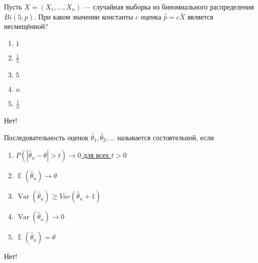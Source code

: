 \documentclass[t]{beamer}
\DeclareMathOperator{\Var}{Var}
\DeclareMathOperator{\E}{\mathbb{E}}
\begin{document}
 \begin{frame} \label{43-No} 
\begin{block}{43} 

Пусть $X = (X_1, \ldots , X_n)$ — случайная выборка из биномиального распределения $Bi(5, p)$. При каком значении константы $c$ оценка  $\hat{p} = c \bar{X}$ является несмещённой?
  


 \end{block} 
\begin{enumerate} 
\item[] \hyperlink{43-No}{\beamergotobutton{} $1$}
\item[] \hyperlink{43-Yes}{\beamergotobutton{} $\frac{1}{5}$}
\item[] \hyperlink{43-No}{\beamergotobutton{} $5$}
\item[] \hyperlink{43-No}{\beamergotobutton{} $n$}
\item[] \hyperlink{43-No}{\beamergotobutton{} $\frac{1}{n}$}
\end{enumerate} 

 \alert{Нет!} 
\end{frame} 


 \begin{frame} \label{44-No} 
\begin{block}{44} 

Последовательность оценок $\hat{\theta}_1, \hat{\theta}_2, ...$ называется состоятельной, если
  


 \end{block} 
\begin{enumerate} 
\item[] \hyperlink{44-Yes}{\beamergotobutton{} $P(|\hat\theta_n - \theta | > t) \to 0$ для всех $t > 0$}
\item[] \hyperlink{44-No}{\beamergotobutton{} $\E(\hat\theta_n) \to \theta$}
\item[] \hyperlink{44-No}{\beamergotobutton{} $\Var(\hat\theta_n) \geq Var(\hat\theta_n + 1)$}
\item[] \hyperlink{44-No}{\beamergotobutton{} $\Var(\hat\theta_n) \to 0$}
\item[] \hyperlink{44-No}{\beamergotobutton{} $\E(\hat\theta_n) = \theta$}
\end{enumerate} 

 \alert{Нет!} 
\end{frame} 
\end{document}
